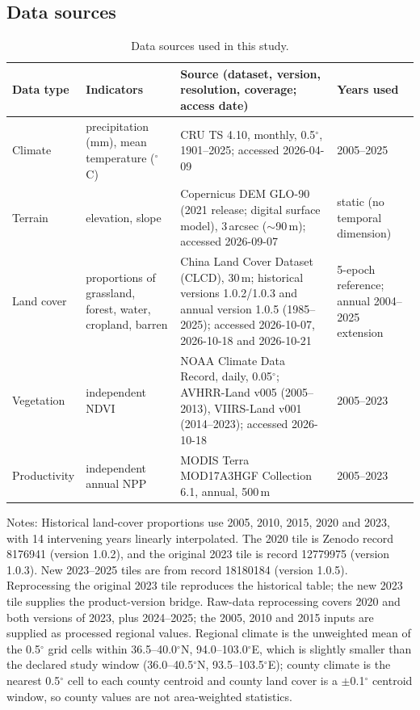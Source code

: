 \documentclass[preprint,11pt,authoryear]{elsarticle}
\begin{document}
\subsection{Data sources}
\label{sec:data}
\begin{table}[htbp]
\centering
\caption{Data sources used in this study.}
\footnotesize
\setlength{\tabcolsep}{3pt}
\label{tab:data}
\small
\small
\setlength{\tabcolsep}{4pt}
\begin{tabular}{lp{3.4cm}p{4.5cm}l}
\toprule
Data type & \raggedright Indicators & \raggedright Source (dataset, version, resolution, coverage; access date) & Years used \\
\midrule
Climate & \raggedright precipitation (mm), mean temperature ($^{\circ}$C) & \raggedright CRU TS 4.10, monthly, 0.5$^\circ$, 1901--2025; accessed 2026-04-09 \citep{cru_ts410} & 2005--2025 \\
Terrain & \raggedright elevation, slope & \raggedright Copernicus DEM GLO-90 (2021 release; digital surface model), 3\,arcsec ($\sim$90\,m); accessed 2026-09-07 & static (no temporal dimension) \\
Land cover & \raggedright proportions of grassland, forest, water, cropland, barren & \raggedright China Land Cover Dataset (CLCD), 30\,m; historical versions 1.0.2/1.0.3 and annual version 1.0.5 (1985--2025); accessed 2026-10-07, 2026-10-18 and 2026-10-21 \citep{yang2021clcd,yang2024clcd} & 5-epoch reference; annual 2004--2025 extension \\
Vegetation & \raggedright independent NDVI & \raggedright NOAA Climate Data Record, daily, 0.05$^\circ$; AVHRR-Land v005 (2005--2013), VIIRS-Land v001 (2014--2023); accessed 2026-10-18 & 2005--2023 \\
Productivity & \raggedright independent annual NPP & \raggedright MODIS Terra MOD17A3HGF Collection 6.1, annual, 500\,m \citep{running2021npp} & 2005--2023 \\
\bottomrule
\end{tabular}

\vspace{2pt}
{\scriptsize Notes: Historical land-cover proportions use 2005, 2010, 2015, 2020 and 2023, with 14 intervening years linearly interpolated. The 2020 tile is Zenodo record 8176941 (version 1.0.2), and the original 2023 tile is record 12779975 (version 1.0.3). New 2023--2025 tiles are from record 18180184 (version 1.0.5). Reprocessing the original 2023 tile reproduces the historical table; the new 2023 tile supplies the product-version bridge. Raw-data reprocessing covers 2020 and both versions of 2023, plus 2024--2025; the 2005, 2010 and 2015 inputs are supplied as processed regional values. Regional climate is the unweighted mean of the 0.5$^\circ$ grid cells within 36.5--40.0$^\circ$N, 94.0--103.0$^\circ$E, which is slightly smaller than the declared study window (36.0--40.5$^\circ$N, 93.5--103.5$^\circ$E); county climate is the nearest 0.5$^\circ$ cell to each county centroid and county land cover is a $\pm$0.1$^\circ$ centroid window, so county values are not area-weighted statistics.}
\end{table}
\end{document}
